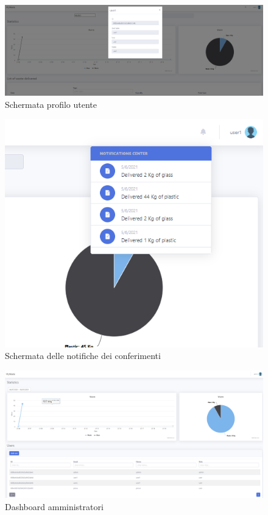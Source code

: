 \documentclass{report}
\begin{document}
\begin{figure}[h!]
    \begin{center}
        \includegraphics[width=1.0\textwidth]{images/userProfile.PNG}  \end{center}
    \caption{Schermata profilo utente}
    \label{fig:userProfile}
\end{figure}
\begin{figure}[h!]
    \begin{center}
        \includegraphics[width=1.0\textwidth]{images/notificheConferimento.PNG}  \end{center}
    \caption{Schermata delle notifiche dei conferimenti}
    \label{fig:notify}
\end{figure}
\begin{figure}[h!]
    \begin{center}
        \includegraphics[width=1.0\textwidth]{images/adminDashboard.PNG}  \end{center}
    \caption{Dashboard amministratori}
    \label{fig:adminDashboard}
\end{figure}
\end{document}
